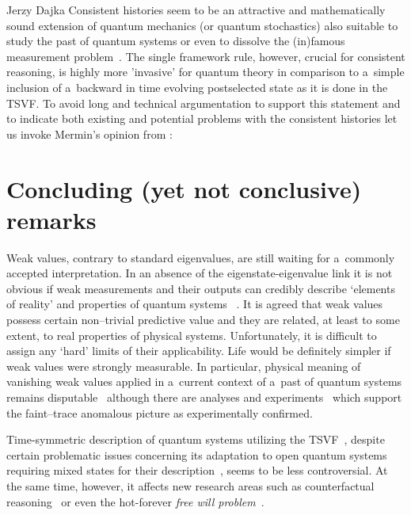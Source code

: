 \begin{artengenv}{Jerzy Dajka}
%
Consistent histories seem to be an attractive and mathematically sound extension of quantum mechanics (or quantum stochastics) also suitable to study the past of quantum systems  or even  to dissolve the  (in)famous measurement problem~\parencite{GRIFFITHS_measur,Griffiths_reason}. The single framework rule, however, crucial for consistent reasoning, is highly more 'invasive' for quantum theory in comparison to a~simple inclusion of a~backward in time evolving postselected state as it is done in the TSVF. To avoid long and technical argumentation  to support this statement and to indicate both existing and potential problems with the consistent histories let us invoke Mermin's opinion from   
\parencite*{mermin}:

\section{Concluding (yet not conclusive) remarks}

Weak values, contrary to standard eigenvalues, are still waiting for a~commonly accepted interpretation. In an absence of the eigenstate-eigenvalue link it is not obvious if weak measurements and their outputs can credibly describe `elements of reality' and properties of quantum systems ~\parencite{Matzkin_prop,vaid_trans}. It is agreed that weak values possess certain non--trivial predictive value and they are related, at least to some extent, to real properties of physical systems. Unfortunately, it is difficult to assign any `hard' limits of their applicability. Life would be definitely simpler if weak values were strongly measurable. In particular,  
  physical meaning of vanishing weak values applied in  a~current context of a~past of quantum systems  remains disputable~\parencite{PhysRevA.95.032110,PhysRevA.97.046102,PhysRevA.97.046103,weak,lady} although  there are analyses and experiments~\parencite{e20110854,PhysRevA.101.052119,pnas,pnas1} which support the faint--trace anomalous picture as experimentally confirmed.   

Time-symmetric description of quantum systems utilizing the TSVF~\parencite{aharonov_entrop,Aharonov2008}, despite certain problematic issues concerning its adaptation to open quantum systems requiring mixed states for their description~\parencite{weak,scirep},   seems to be less controversial. At the same time, however, it affects new research areas such as counterfactual reasoning~\parencite{kont0}  or even the hot-forever {\it free will problem}~\parencite{wil}. 


\end{artengenv}
